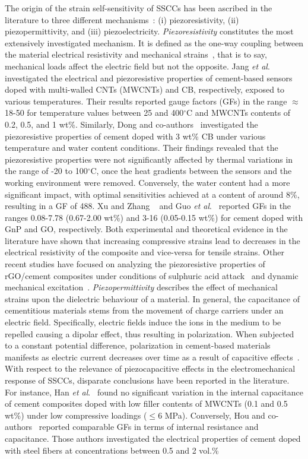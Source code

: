 \documentclass[a4paper,fleqn]{cas-sc}
\begin{document}
The origin of the strain self-sensitivity of SSCCs has been ascribed in the literature to three different mechanisms~\cite{Ramachandran2022}: (i) piezoresistivity, (ii) piezopermittivity, and (iii) piezoelectricity. \textit{Piezoresistivity} constitutes the most extensively investigated mechanism. It is defined as the one-way coupling between the material electrical resistivity and mechanical strains~\cite{Dong2019}, that is to say, mechanical loads affect the electric field but not the opposite. Jang \textit{et al}.~\cite{Jang2022} investigated the electrical and piezoresistive properties of cement-based sensors doped with multi-walled CNTs (MWCNTs) and CB, respectively, exposed to various temperatures. Their results reported gauge factors (GFs) in the range $\approx$18-50 for temperature values between 25 and 400$^\circ$C and MWCNTs contents of 0.2, 0.5, and 1 wt\%. Similarly, Dong and co-authors~\cite{DONG2019107488} investigated the piezoresistive properties of cement doped with 3 wt\% CB under various temperature and water content conditions. Their findings revealed that the piezoresistive properties were not significantly affected by thermal variations in the range of -20 to 100$^\circ$C, once the heat gradients between the sensors and the working environment were removed. Conversely, the water content had a more significant impact, with optimal sensitivities achieved at a content of around 8\%, resulting in a GF of 488. Xu and Zhang ~\cite{xu2017pressure} and Guo \textit{et al}.~\cite{guo2021study} reported GFs in the ranges 0.08-7.78 (0.67-2.00 wt\%) and 3-16 (0.05-0.15 wt\%) for cement doped with GnP and GO, respectively. Both experimental and theoretical evidence in the literature have shown that increasing compressive strains lead to decreases in the electrical resistivity of the composite and vice-versa for tensile strains. Other recent studies have focused on analyzing the piezoresistive properties of rGO/cement composites under conditions of sulphuric acid attack~\cite{DONG2021100563} and dynamic mechanical excitation~\cite{QI2023130340}. \textit{Piezopermittivity} describes the effect of mechanical strains upon the dielectric behaviour of a material. In general, the capacitance of cementitious materials stems from the movement of charge carriers under an electric field. Specifically, electric fields induce the ions in the medium to be repelled causing a dipolar effect, thus resulting in polarization. When subjected to a constant potential difference, polarization in cement-based materials manifests as electric current decreases over time as a result of capacitive effects~\cite{wen2001electric,Cao2004}. With respect to the relevance of piezocapacitive effects in the electromechanical response of SSCCs, disparate conclusions have been reported in the literature. For instance, Han \textit{et al}.~\cite{Han2012} found no significant variation in the internal capacitance of cement composites doped with low filler contents of MWCNTs (0.1 and 0.5 wt\%) under low compressive loadings ($\leq$6 MPa). Conversely, Hou and co-authors~\cite{Hou2022} reported comparable GFs in terms of internal resistance and capacitance. Those authors investigated the electrical properties of cement doped with steel fibers at concentrations between 0.5 and 2 vol.\% 
\end{document}
